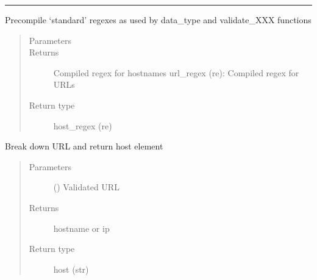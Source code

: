 \documentclass[letterpaper,10pt,english]{sphinxmanual}
\begin{document}
\bigskip\hrule\bigskip


\begin{fulllineitems}
\label{\detokenize{utils:bloxone.utils.buildregex}}
\sphinxAtStartPar
Pre\sphinxhyphen{}compile ‘standard’ regexes as used by data\_type and
validate\_XXX functions
\begin{quote}\begin{description}
\item[{Parameters}] \leavevmode
\sphinxAtStartPar
{} \textendash{} 

\item[{Returns}] \leavevmode
\sphinxAtStartPar
Compiled regex for hostnames
url\_regex (re): Compiled regex for URLs

\item[{Return type}] \leavevmode
\sphinxAtStartPar
host\_regex (re)

\end{description}\end{quote}

\end{fulllineitems}


\begin{fulllineitems}
\label{\detokenize{utils:bloxone.utils.convert_url_to_host}}
\sphinxAtStartPar
Break down URL and return host element
\begin{quote}\begin{description}
\item[{Parameters}] \leavevmode
\sphinxAtStartPar
{} () \textendash{} Validated URL

\item[{Returns}] \leavevmode
\sphinxAtStartPar
hostname or ip

\item[{Return type}] \leavevmode
\sphinxAtStartPar
host (str)

\end{description}\end{quote}

\end{fulllineitems}
\end{document}

